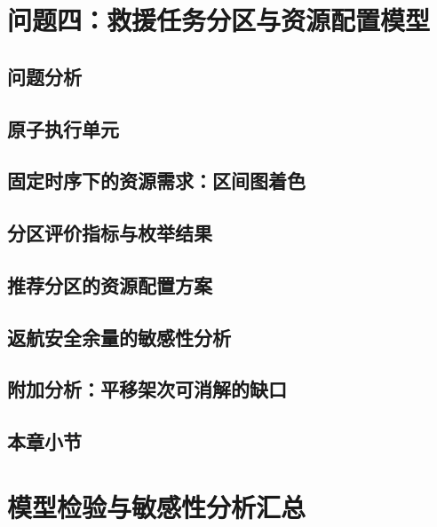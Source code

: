 \documentclass[bwprint,fontset=windows]{gmcmthesis}
\begin{document}
\vspace{\baselineskip}
\section{问题四：救援任务分区与资源配置模型}



\subsection{问题分析}



\subsection{原子执行单元}



\subsection{固定时序下的资源需求：区间图着色}


\subsection{分区评价指标与枚举结果}


\subsection{推荐分区的资源配置方案}


\subsection{返航安全余量的敏感性分析}


\subsection{附加分析：平移架次可消解的缺口}


\subsection{本章小节}



\vspace{\baselineskip}
\section{模型检验与敏感性分析汇总}
\end{document}
